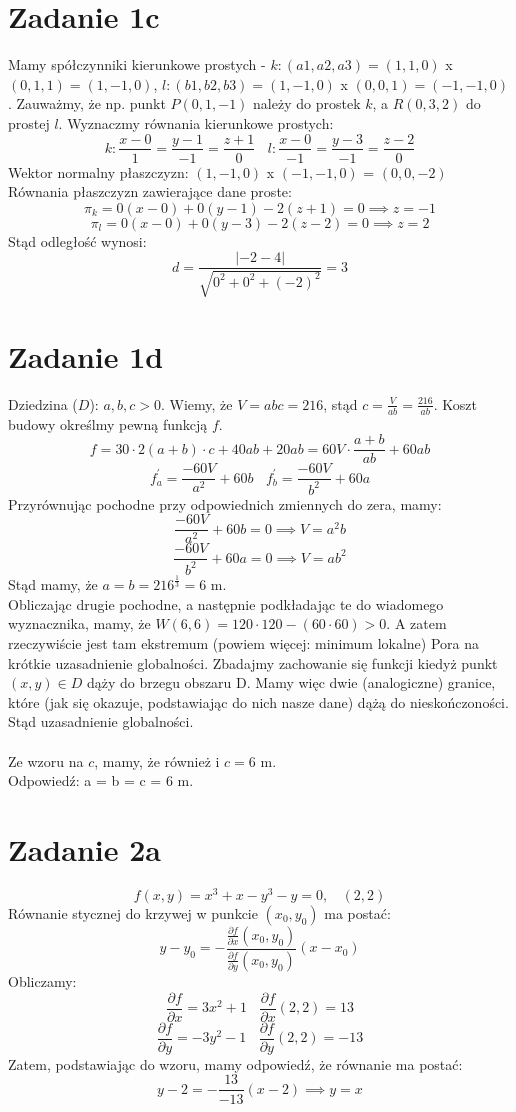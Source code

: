 \documentclass{article}
\begin{document}
\section*{Zadanie 1c}

Mamy spółczynniki kierunkowe prostych - $k: (a1, a2, a3) = (1,1,0)$ x $(0,1,1) = (1,-1,0)$, $l: (b1,b2,b3) = (1,-1,0)$ x $(0,0,1) = (-1,-1,0)$. Zauważmy, że np. punkt $P(0,1,-1)$ należy do prostek $k$, a $R(0,3,2)$ do prostej $l$. Wyznaczmy równania kierunkowe prostych:
$$k: \frac{x-0}{1} = \frac{y-1}{-1} = \frac{z+1}{0} \ \ \ \ l: \frac{x-0}{-1} = \frac{y-3}{-1} = \frac{z-2}{0}$$
Wektor normalny płaszczyzn: $(1,-1,0)$ x $(-1,-1,0)$ = $(0,0,-2)$
Równania płaszczyzn zawierające dane proste:
$$\pi_{k} = 0(x-0)+0(y-1)-2(z+1) = 0 \implies z = -1$$
$$\pi_{l} = 0(x-0)+0(y-3)-2(z-2) = 0 \implies z = 2$$
Stąd odległość wynosi:
$$d = \frac{|-2-4|}{\sqrt{0^2+0^2+(-2)^2}} = 3$$

\section*{Zadanie 1d}

Dziedzina ($D$): $a,b,c > 0$. Wiemy, że $V = abc = 216$, stąd $c = \frac{V}{ab} = \frac{216}{ab}$. Koszt budowy określmy pewną funkcją $f$.
$$f = 30 \cdot 2(a+b)\cdot c + 40ab + 20ab = 60V \cdot \frac{a+b}{ab}+60ab$$
$$f^{'}_{a} = \frac{-60V}{a^2}+60b \ \ \ \ f^{'}_{b} = \frac{-60V}{b^2}+60a$$
Przyrównując pochodne przy odpowiednich zmiennych do zera, mamy:
$$\frac{-60V}{a^2}+60b = 0 \implies V = a^2b$$
$$\frac{-60V}{b^2}+60a = 0 \implies V = ab^2$$
Stąd mamy, że $a = b = 216^{\frac{1}{3}} = 6$ m. \\
Obliczając drugie pochodne, a następnie podkładając te do wiadomego wyznacznika, mamy, że $W(6,6) = 120 \cdot 120 - (60 \cdot 60) > 0$. A zatem rzeczywiście jest tam ekstremum (powiem więcej: minimum lokalne) Pora na krótkie uzasadnienie globalności. Zbadajmy zachowanie się funkcji kiedyż punkt $(x,y) \in D$ dąży do brzegu obszaru D. Mamy więc dwie (analogiczne) granice, które (jak się okazuje, podstawiając do nich nasze dane) dążą do nieskończoności. Stąd uzasadnienie globalności. \\ \\
Ze wzoru na $c$, mamy, że również i $c = 6$ m. \\
Odpowiedź: a = b = c = 6 m.


\section*{Zadanie 2a}
$$f(x,y) = x^3+x-y^3-y = 0, \ \ \ \ (2,2)$$
Równanie stycznej do krzywej w punkcie $(x_0,y_0)$ ma postać: 
$$y-y_0 = - \frac{\frac{\partial f}{\partial x}(x_0,y_0)}{\frac{\partial f}{\partial y}(x_0,y_0)}(x-x_0)$$
Obliczamy:
$$\frac{\partial f}{\partial x} = 3x^2+1 \ \ \ \ \frac{\partial f}{\partial x} (2,2) = 13$$
$$\frac{\partial f}{\partial y} = -3y^2-1 \ \ \ \ \frac{\partial f}{\partial y} (2,2) = -13$$
Zatem, podstawiając do wzoru, mamy odpowiedź, że równanie ma postać:
$$y-2 = - \frac{13}{-13}(x-2) \implies y = x$$
\end{document}
